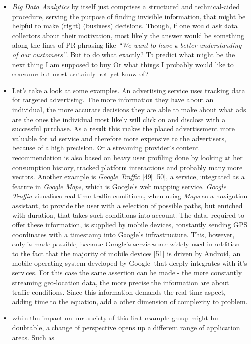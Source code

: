 \documentclass[12pt,english,a4paper,titlepage,cleardoublepage=empty,dottedtoc]{report}
\begin{document}
\begin{itemize}
\item
  \emph{Big Data Analytics} by itself just comprises a structured and
  technical-aided procedure, serving the purpose of finding invisible
  information, that might be helpful to make (right) (business)
  decisions. Though, if one would ask data collectors about their
  motivation, most likely the answer would be something along the lines
  of PR phrasing like \emph{``We want to have a better understanding of
  our customers''}. But to do what exactly? To predict what might be the
  next thing I am supposed to buy Or what things I probably would like
  to consume but most certainly not yet know of?
\item
  Let's take a look at some examples. An advertising service uses
  tracking data for targeted advertising. The more information they have
  about an individual, the more accurate decisions they are able to make
  about what ads are the ones the individual most likely will click on
  and disclose with a successful purchase. As a result this makes the
  placed advertisement more valuable for ad service and therefore more
  expensive to the advertisers, because of a high precision. Or a
  streaming provider's content recommendation is also based on heavy
  user profiling done by looking at her consumption history, tracked
  platform interactions and probably many more vectors. Another example
  is \emph{Google Traffic}
  {[}\protect\hyperlink{ref-web_2007_introducing-google-traffic}{49}{]}
  {[}\protect\hyperlink{ref-web_2016_wikipedia_google-traffic}{50}{]}, a
  service, integrated as a feature in \emph{Google Maps}, which is
  Google's web mapping service. \emph{Google Traffic} visualises
  real-time traffic conditions, when using \emph{Maps} as a navigation
  assistant, to provide the user with a selection of possible paths, but
  enriched with duration, that takes such conditions into account. The
  data, required to offer these information, is supplied by mobile
  devices, constantly sending GPS coordinates with a timestamp into
  Google's infrastructure. This, however, only is made possible, because
  Google's services are widely used in addition to the fact that the
  majority of mobile devices
  {[}\protect\hyperlink{ref-graphic_2016_global-mobile-os-market-share}{51}{]}
  is driven by Android, an mobile operating system developed by Google,
  that deeply integrates with it's services. For this case the same
  assertion can be made - the more constantly streaming geo-location
  data, the more precise the information are about traffic conditions.
  Since this information demands the real-time aspect, adding time to
  the equation, add a other dimension of complexity to problem.
\item
  while the impact on our society of this first example group might be
  doubtable, a change of perspective opens up a different range of
  application areas. Such as


\end{itemize}
\end{document}

